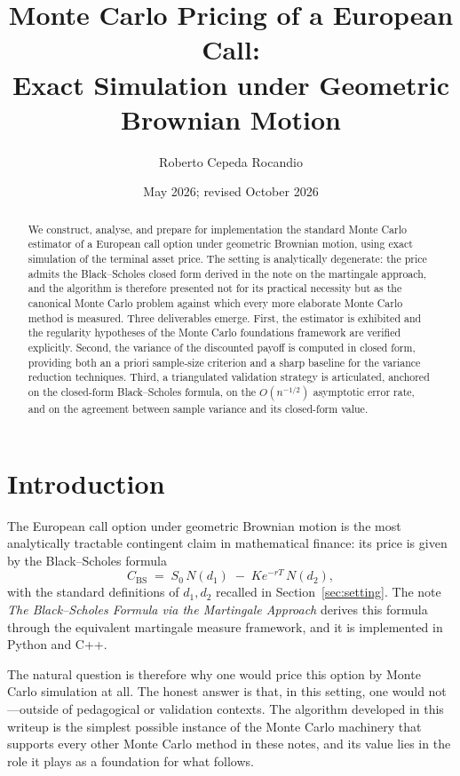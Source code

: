 \documentclass[11pt,a4paper]{article}
\title{Monte Carlo Pricing of a European Call:\\
       Exact Simulation under Geometric Brownian Motion}
\author{Roberto Cepeda Rocandio}
\date{May 2026; revised October 2026}
\theoremstyle{plain}
\theoremstyle{definition}
\theoremstyle{remark}
\begin{document}
\maketitle

\begin{abstract}
We construct, analyse, and prepare for implementation the standard
Monte Carlo estimator of a European call option under geometric
Brownian motion, using exact simulation of the terminal asset price.
The setting is analytically degenerate: the price admits the
Black--Scholes closed form derived in the note on the martingale
approach, and the algorithm is
therefore presented not for its practical necessity but as the
canonical Monte Carlo problem against which every more elaborate Monte Carlo
method is measured. Three deliverables emerge. First, the
estimator is exhibited and the regularity hypotheses of the Monte Carlo
foundations framework are verified explicitly. Second, the variance of the
discounted payoff is computed in closed form, providing both an a
priori sample-size criterion and a sharp baseline for the variance
reduction techniques. Third, a triangulated validation strategy is
articulated, anchored on the closed-form Black--Scholes formula, on the
$O(n^{-1/2})$ asymptotic error rate, and on the agreement between
sample variance and its closed-form value.
\end{abstract}

\tableofcontents

\section{Introduction}
\label{sec:intro}

The European call option under geometric Brownian motion is the most
analytically tractable contingent claim in mathematical finance: its
price is given by the Black--Scholes formula
\begin{equation}
\label{eq:bs}
C_{\mathrm{BS}} \;=\; S_0\,N(d_1) \;-\; K e^{-rT}\,N(d_2),
\end{equation}
with the standard definitions of $d_1, d_2$ recalled in
Section~\ref{sec:setting}. The note \emph{The Black--Scholes Formula via
the Martingale Approach} derives this formula
through the equivalent martingale measure framework, and it is implemented
in Python and C++.

The natural question is therefore why one would price this option by
Monte Carlo simulation at all. The honest answer is that, in this
setting, one would not---outside of pedagogical or validation contexts.
The algorithm developed in this writeup is the simplest possible
instance of the Monte Carlo machinery that supports every other
Monte Carlo method in these notes, and its value lies in the role it
plays as a foundation for what follows.
\end{document}
